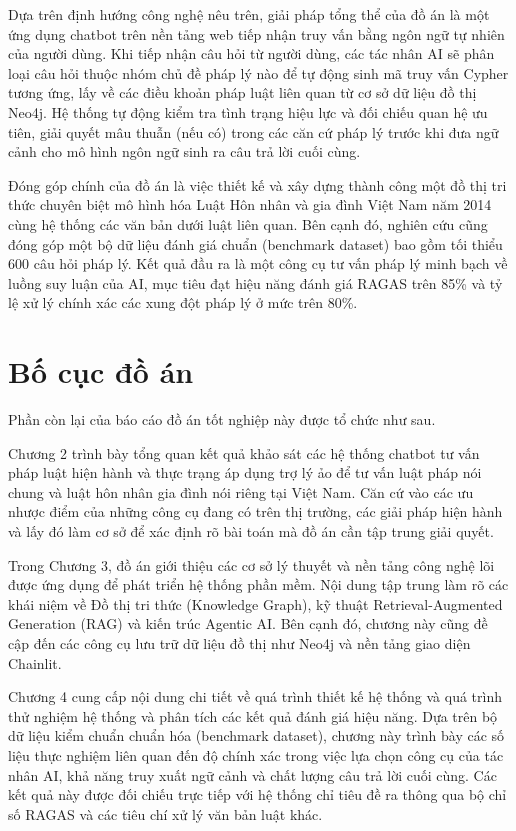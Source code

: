 \documentclass[../DoAn.tex]{subfiles}
\begin{document}
Dựa trên định hướng công nghệ nêu trên, giải pháp tổng thể của đồ án là một ứng dụng chatbot trên nền tảng web tiếp nhận truy vấn bằng ngôn ngữ tự nhiên của người dùng. Khi tiếp nhận câu hỏi từ người dùng, các tác nhân AI sẽ phân loại câu hỏi thuộc nhóm chủ đề pháp lý nào để tự động sinh mã truy vấn Cypher tương ứng, lấy về các điều khoản pháp luật liên quan từ cơ sở dữ liệu đồ thị Neo4j. Hệ thống tự động kiểm tra tình trạng hiệu lực và đối chiếu quan hệ ưu tiên, giải quyết mâu thuẫn (nếu có) trong các căn cứ pháp lý trước khi đưa ngữ cảnh cho mô hình ngôn ngữ sinh ra câu trả lời cuối cùng. 

Đóng góp chính của đồ án là việc thiết kế và xây dựng thành công một đồ thị tri thức chuyên biệt mô hình hóa Luật Hôn nhân và gia đình Việt Nam năm 2014 cùng hệ thống các văn bản dưới luật liên quan. Bên cạnh đó, nghiên cứu cũng đóng góp một bộ dữ liệu đánh giá chuẩn (benchmark dataset) bao gồm tối thiểu 600 câu hỏi pháp lý. Kết quả đầu ra là một công cụ tư vấn pháp lý minh bạch về luồng suy luận của AI, mục tiêu đạt hiệu năng đánh giá RAGAS trên 85\% và tỷ lệ xử lý chính xác các xung đột pháp lý ở mức trên 80\%.

\section{Bố cục đồ án}
\label{section:1.4}

Phần còn lại của báo cáo đồ án tốt nghiệp này được tổ chức như sau.

Chương 2 trình bày tổng quan kết quả khảo sát các hệ thống chatbot tư vấn pháp luật hiện hành và thực trạng áp dụng trợ lý ảo để tư vấn luật pháp nói chung và luật hôn nhân gia đình nói riêng tại Việt Nam. Căn cứ vào các ưu nhược điểm của những công cụ đang có trên thị trường, các giải pháp hiện hành và lấy đó làm cơ sở để xác định rõ bài toán mà đồ án cần tập trung giải quyết.

Trong Chương 3, đồ án giới thiệu các cơ sở lý thuyết và nền tảng công nghệ lõi được ứng dụng để phát triển hệ thống phần mềm. Nội dung tập trung làm rõ các khái niệm về Đồ thị tri thức (Knowledge Graph), kỹ thuật Retrieval-Augmented Generation (RAG) và kiến trúc Agentic AI. Bên cạnh đó, chương này cũng đề cập đến các công cụ lưu trữ dữ liệu đồ thị như Neo4j và nền tảng giao diện Chainlit.

Chương 4 cung cấp nội dung chi tiết về quá trình thiết kế hệ thống và quá trình thử nghiệm hệ thống và phân tích các kết quả đánh giá hiệu năng. Dựa trên bộ dữ liệu kiểm chuẩn chuẩn hóa (benchmark dataset), chương này trình bày các số liệu thực nghiệm liên quan đến độ chính xác trong việc lựa chọn công cụ của tác nhân AI, khả năng truy xuất ngữ cảnh và chất lượng câu trả lời cuối cùng. Các kết quả này được đối chiếu trực tiếp với hệ thống chỉ tiêu đề ra thông qua bộ chỉ số RAGAS và các tiêu chí xử lý văn bản luật khác.
\end{document}
